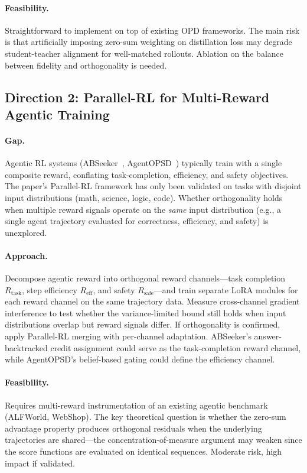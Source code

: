 \documentclass[11pt,a4paper]{article}
\begin{document}
\paragraph{Feasibility.} Straightforward to implement on top of existing OPD frameworks. The main risk is that artificially imposing zero-sum weighting on distillation loss may degrade student-teacher alignment for well-matched rollouts. Ablation on the balance between fidelity and orthogonality is needed.

\subsection{Direction 2: Parallel-RL for Multi-Reward Agentic Training}

\paragraph{Gap.} Agentic RL systems (ABSeeker~\cite{abseeker2026}, AgentOPSD~\cite{agentopsd2026}) typically train with a single composite reward, conflating task-completion, efficiency, and safety objectives. The paper's Parallel-RL framework has only been validated on tasks with disjoint input distributions (math, science, logic, code). Whether orthogonality holds when multiple reward signals operate on the \emph{same} input distribution (e.g., a single agent trajectory evaluated for correctness, efficiency, and safety) is unexplored.

\paragraph{Approach.} Decompose agentic reward into orthogonal reward channels---task completion $R_{\text{task}}$, step efficiency $R_{\text{eff}}$, and safety $R_{\text{safe}}$---and train separate LoRA modules for each reward channel on the same trajectory data. Measure cross-channel gradient interference to test whether the variance-limited bound still holds when input distributions overlap but reward signals differ. If orthogonality is confirmed, apply Parallel-RL merging with per-channel adaptation. ABSeeker's answer-backtracked credit assignment could serve as the task-completion reward channel, while AgentOPSD's belief-based gating could define the efficiency channel.

\paragraph{Feasibility.} Requires multi-reward instrumentation of an existing agentic benchmark (ALFWorld, WebShop). The key theoretical question is whether the zero-sum advantage property produces orthogonal residuals when the underlying trajectories are shared---the concentration-of-measure argument may weaken since the score functions are evaluated on identical sequences. Moderate risk, high impact if validated.
\end{document}
